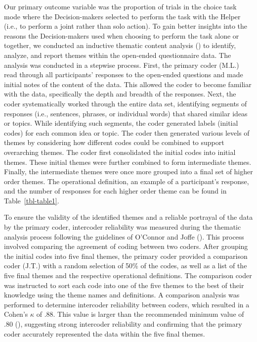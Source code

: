 \documentclass[
  man,
  floatsintext,
  longtable,
  nolmodern,
  notxfonts,
  notimes,
  mask,
  colorlinks=true,linkcolor=blue,citecolor=blue,urlcolor=blue]{apa7}
\begin{document}
Our primary outcome variable was the proportion of trials in the choice
task mode where the Decision-makers selected to perform the task with
the Helper (i.e., to perform a joint rather than solo action). To gain
better insights into the reasons the Decision-makers used when choosing
to perform the task alone or together, we conducted an inductive
thematic content analysis () to identify, analyze, and report themes within the open-ended
questionnaire data. The analysis was conducted in a stepwise process.
First, the primary coder (M.L.) read through all participants' responses
to the open-ended questions and made initial notes of the content of the
data. This allowed the coder to become familiar with the data,
specifically the depth and breadth of the responses. Next, the coder
systematically worked through the entire data set, identifying segments
of responses (i.e., sentences, phrases, or individual words) that shared
similar ideas or topics. While identifying such segments, the coder
generated labels (initial codes) for each common idea or topic. The
coder then generated various levels of themes by considering how
different codes could be combined to support overarching themes. The
coder first consolidated the initial codes into initial themes. These
initial themes were further combined to form intermediate themes.
Finally, the intermediate themes were once more grouped into a final set
of higher order themes. The operational definition, an example of a
participant's response, and the number of responses for each higher
order theme can be found in Table~\ref{tbl-table1}.

To ensure the validity of the identified themes and a reliable portrayal
of the data by the primary coder, intercoder reliability was measured
during the thematic analysis process following the guidelines of
O'Connor and Joffe (). This process
involved comparing the agreement of coding between two coders. After
grouping the initial codes into five final themes, the primary coder
provided a comparison coder (J.T.) with a random selection of 50\% of
the codes, as well as a list of the five final themes and the respective
operational definitions. The comparison coder was instructed to sort
each code into one of the five themes to the best of their knowledge
using the theme names and definitions. A comparison analysis was
performed to determine intercoder reliability between coders, which
resulted in a Cohen's \(\kappa\) of .88. This value is larger than the
recommended minimum value of .80 (), suggesting strong intercoder reliability and confirming
that the primary coder accurately represented the data within the five
final themes.
\end{document}
